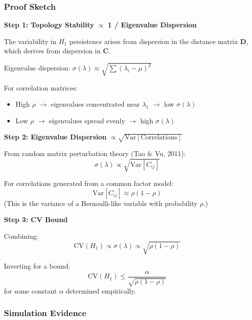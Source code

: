 \subsubsection{Proof Sketch}

\textbf{Step 1: Topology Stability} $\propto$ \textbf{1 / Eigenvalue Dispersion}

The variability in $H_1$ persistence arises from dispersion in the distance matrix $\mathbf{D}$, which derives from dispersion in $\mathbf{C}$.

Eigenvalue dispersion: $\sigma(\lambda) \approx \sqrt{\sum (\lambda_i - \mu)^2}$

For correlation matrices:
\begin{itemize}
\item High $\rho$ $\rightarrow$ eigenvalues concentrated near $\lambda_1$ $\rightarrow$ low $\sigma(\lambda)$
\item Low $\rho$ $\rightarrow$ eigenvalues spread evenly $\rightarrow$ high $\sigma(\lambda)$
\end{itemize}

\textbf{Step 2: Eigenvalue Dispersion} $\propto \sqrt{\text{Var}[\text{Correlations}]}$

From random matrix perturbation theory (Tao \& Vu, 2011):
\begin{equation}
\sigma(\lambda) \propto \sqrt{\text{Var}[C_{ij}]}
\end{equation}

For correlations generated from a common factor model:
\begin{equation}
\text{Var}[C_{ij}] \approx \rho(1 - \rho)
\end{equation}
(This is the variance of a Bernoulli-like variable with probability $\rho$.)

\textbf{Step 3: CV Bound}

Combining:
\begin{equation}
\text{CV}(H_1) \propto \sigma(\lambda) \propto \sqrt{\rho(1-\rho)}
\end{equation}

Inverting for a bound:
\begin{equation}
\text{CV}(H_1) \leq \frac{\alpha}{\sqrt{\rho(1-\rho)}}
\end{equation}
for some constant $\alpha$ determined empirically.

\subsubsection{Simulation Evidence}


